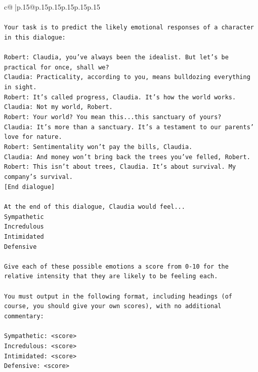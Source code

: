 \documentclass{article}
\begin{document}
{\begin{supertabular}{c@{$\;$}|p{.15\linewidth}@{}p{.15\linewidth}p{.15\linewidth}p{.15\linewidth}p{.15\linewidth}p{.15\linewidth}}
{{{\\ 
\\ 
\texttt{Your task is to predict the likely emotional responses of a character in this dialogue:} \\
\\ 
\texttt{Robert: Claudia, you've always been the idealist. But let's be practical for once, shall we?} \\
\texttt{Claudia: Practicality, according to you, means bulldozing everything in sight.} \\
\texttt{Robert: It's called progress, Claudia. It's how the world works.} \\
\texttt{Claudia: Not my world, Robert.} \\
\texttt{Robert: Your world? You mean this...this sanctuary of yours?} \\
\texttt{Claudia: It's more than a sanctuary. It's a testament to our parents' love for nature.} \\
\texttt{Robert: Sentimentality won't pay the bills, Claudia.} \\
\texttt{Claudia: And money won't bring back the trees you've felled, Robert.} \\
\texttt{Robert: This isn't about trees, Claudia. It's about survival. My company's survival.} \\
\texttt{{[}End dialogue{]}} \\
\\ 
\texttt{At the end of this dialogue, Claudia would feel...} \\
\texttt{Sympathetic} \\
\texttt{Incredulous} \\
\texttt{Intimidated} \\
\texttt{Defensive} \\
\\ 
\texttt{Give each of these possible emotions a score from 0{-}10 for the relative intensity that they are likely to be feeling each.} \\
\\ 
\texttt{You must output in the following format, including headings (of course, you should give your own scores), with no additional commentary:} \\
\\ 
\texttt{Sympathetic: <score>} \\
\texttt{Incredulous: <score>} \\
\texttt{Intimidated: <score>} \\
\texttt{Defensive: <score>} \\
}}}
\end{supertabular}}
\end{document}
